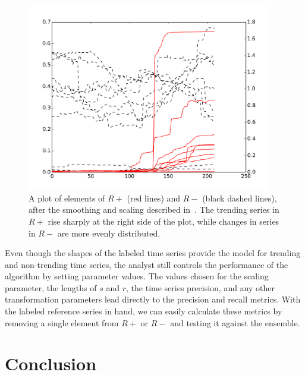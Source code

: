\documentclass{article}
\begin{document}
\begin{figure}
\begin{center}
\includegraphics[width=0.95\textwidth]{fig/nikolov3.pdf} 
\caption{A plot of elements of $R+$ (red lines) and $R-$ (black dashed lines), 
after the smoothing and scaling described in~\cite{Nikolov:2011}.  
The trending series in $R+$ rise sharply at the right side of the plot, 
while changes in series in $R-$ are more evenly distributed.}
\label{fig:reference_series}
\end{center}
\end{figure}

Even though the shapes of the labeled time series provide the model for
trending and non-trending time series, the analyst still controls the performance
of the algorithm by setting parameter values.
The values chosen for the scaling parameter, the lengths of $s$ and $r$, the time series
precision, and any other transformation parameters lead directly to the
precision and recall metrics. With the labeled reference series
in hand, we can easily calculate these metrics by removing a single
element from $R+$ or $R-$ and testing it against the ensemble. 


\section{Conclusion} 
\end{document}
